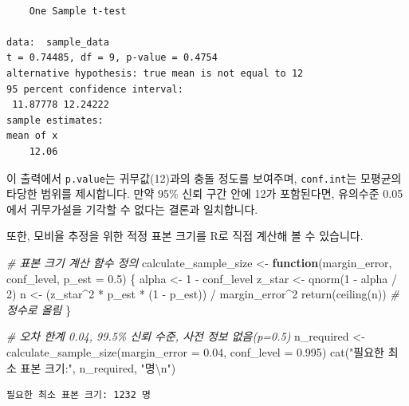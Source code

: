 \documentclass[
]{scrbook}
\newenvironment{Shaded}{}{}
\newcommand{\AttributeTok}[1]{\textcolor[rgb]{0.49,0.56,0.16}{#1}}
\newcommand{\CommentTok}[1]{\textcolor[rgb]{0.38,0.63,0.69}{\textit{#1}}}
\newcommand{\ControlFlowTok}[1]{\textcolor[rgb]{0.00,0.44,0.13}{\textbf{#1}}}
\newcommand{\DecValTok}[1]{\textcolor[rgb]{0.25,0.63,0.44}{#1}}
\newcommand{\FloatTok}[1]{\textcolor[rgb]{0.25,0.63,0.44}{#1}}
\newcommand{\FunctionTok}[1]{\textcolor[rgb]{0.02,0.16,0.49}{#1}}
\newcommand{\NormalTok}[1]{#1}
\newcommand{\OtherTok}[1]{\textcolor[rgb]{0.00,0.44,0.13}{#1}}
\newcommand{\SpecialCharTok}[1]{\textcolor[rgb]{0.25,0.44,0.63}{#1}}
\newcommand{\StringTok}[1]{\textcolor[rgb]{0.25,0.44,0.63}{#1}}
\begin{document}
\begin{verbatim}

    One Sample t-test

data:  sample_data
t = 0.74485, df = 9, p-value = 0.4754
alternative hypothesis: true mean is not equal to 12
95 percent confidence interval:
 11.87778 12.24222
sample estimates:
mean of x 
    12.06 
\end{verbatim}

이 출력에서 \texttt{p.value}는 귀무값(12)과의 충돌 정도를 보여주며,
\texttt{conf.int}는 모평균의 타당한 범위를 제시합니다. 만약 95\% 신뢰
구간 안에 12가 포함된다면, 유의수준 0.05에서 귀무가설을 기각할 수 없다는
결론과 일치합니다.

또한, 모비율 추정을 위한 적정 표본 크기를 R로 직접 계산해 볼 수
있습니다.

\begin{Shaded}
\begin{Highlighting}[]
\CommentTok{\# 표본 크기 계산 함수 정의}
\NormalTok{calculate\_sample\_size }\OtherTok{\textless{}{-}} \ControlFlowTok{function}\NormalTok{(margin\_error, conf\_level, }\AttributeTok{p\_est =} \FloatTok{0.5}\NormalTok{) \{}
\NormalTok{  alpha }\OtherTok{\textless{}{-}} \DecValTok{1} \SpecialCharTok{{-}}\NormalTok{ conf\_level}
\NormalTok{  z\_star }\OtherTok{\textless{}{-}} \FunctionTok{qnorm}\NormalTok{(}\DecValTok{1} \SpecialCharTok{{-}}\NormalTok{ alpha }\SpecialCharTok{/} \DecValTok{2}\NormalTok{)}
\NormalTok{  n }\OtherTok{\textless{}{-}}\NormalTok{ (z\_star}\SpecialCharTok{\^{}}\DecValTok{2} \SpecialCharTok{*}\NormalTok{ p\_est }\SpecialCharTok{*}\NormalTok{ (}\DecValTok{1} \SpecialCharTok{{-}}\NormalTok{ p\_est)) }\SpecialCharTok{/}\NormalTok{ margin\_error}\SpecialCharTok{\^{}}\DecValTok{2}
  \FunctionTok{return}\NormalTok{(}\FunctionTok{ceiling}\NormalTok{(n)) }\CommentTok{\# 정수로 올림}
\NormalTok{\}}

\CommentTok{\# 오차 한계 0.04, 99.5\% 신뢰 수준, 사전 정보 없음(p=0.5)}
\NormalTok{n\_required }\OtherTok{\textless{}{-}} \FunctionTok{calculate\_sample\_size}\NormalTok{(}\AttributeTok{margin\_error =} \FloatTok{0.04}\NormalTok{, }\AttributeTok{conf\_level =} \FloatTok{0.995}\NormalTok{)}
\FunctionTok{cat}\NormalTok{(}\StringTok{"필요한 최소 표본 크기:"}\NormalTok{, n\_required, }\StringTok{"명}\SpecialCharTok{\textbackslash{}n}\StringTok{"}\NormalTok{)}
\end{Highlighting}
\end{Shaded}

\begin{verbatim}
필요한 최소 표본 크기: 1232 명
\end{verbatim}
\end{document}
